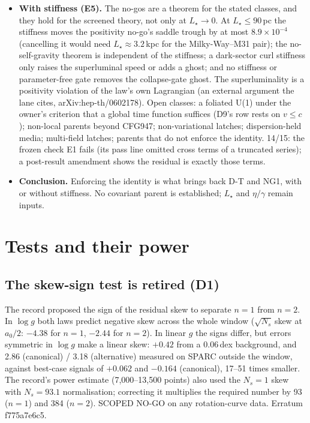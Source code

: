 \documentclass[10pt]{article}
\begin{document}
\begin{itemize}
\item \textbf{With stiffness (E5).} The no-gos are a theorem for the stated classes, and they hold for the screened theory, not only at $L_\star\to0$. At $L_\star\le90$\,pc the stiffness moves the positivity no-go's saddle trough by at most $8.9\times10^{-4}$ (cancelling it would need $L_\star\approx3.2$\,kpc for the Milky-Way--M31 pair); the no-self-gravity theorem is independent of the stiffness; a dark-sector curl stiffness only raises the superluminal speed or adds a ghost; and no stiffness or parameter-free gate removes the collapse-gate ghost. The superluminality is a positivity violation of the law's own Lagrangian (an external argument the lane cites, arXiv:hep-th/0602178). Open classes: a foliated U(1) under the owner's criterion that a global time function suffices (D9's row rests on $v\le c$); non-local parents beyond CFG947; non-variational latches; dispersion-held media; multi-field latches; parents that do not enforce the identity. 14/15: the frozen check E1 fails (its pass line omitted cross terms of a truncated series); a post-result amendment shows the residual is exactly those terms.
\item \textbf{Conclusion.} Enforcing the identity is what brings back D-T and NG1, with or without stiffness. No covariant parent is established; $L_\star$ and $\eta/\gamma$ remain inputs.
\end{itemize}

\section{Tests and their power}
\subsection{The skew-sign test is retired (D1)}
The record proposed the sign of the residual skew to separate $n=1$ from $n=2$. In $\log g$ both laws predict negative skew across the whole window ($\sqrt{N_s}\,$skew at $a_0/2$: $-4.38$ for $n=1$, $-2.44$ for $n=2$). In linear $g$ the signs differ, but errors symmetric in $\log g$ make a linear skew: $+0.42$ from a 0.06\,dex background, and 2.86 (canonical) / 3.18 (alternative) measured on SPARC outside the window, against best-case signals of $+0.062$ and $-0.164$ (canonical), 17--51 times smaller. The record's power estimate (7,000--13,500 points) also used the $N_s=1$ skew with $N_s=93.1$ normalisation; correcting it multiplies the required number by 93 ($n=1$) and 384 ($n=2$). SCOPED NO-GO on any rotation-curve data. Erratum f775a7e6c5.
\end{document}
